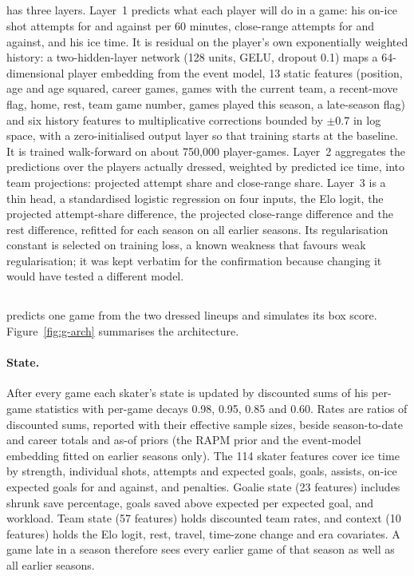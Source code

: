\subsection{\neurhlH{}}
\label{sec:m-h}

\neurhlH{} has three layers. Layer~1 predicts what each player will do in a game:
his on-ice shot attempts for and against per 60 minutes, close-range attempts
for and against, and his ice time. It is residual on the player's own
exponentially weighted history: a two-hidden-layer network (128 units, GELU,
dropout 0.1) maps a 64-dimensional player embedding from the event model, 13
static features (position, age and age squared, career games, games with the
current team, a recent-move flag, home, rest, team game number, games played
this season, a late-season flag) and six history features to multiplicative
corrections bounded by $\pm 0.7$ in log space, with a zero-initialised output
layer so that training starts at the baseline. It is trained walk-forward on
about 750,000 player-games. Layer~2 aggregates the predictions over the
players actually dressed, weighted by predicted ice time, into team
projections: projected attempt share and close-range share. Layer~3 is a thin
head, a standardised logistic regression on four inputs, the Elo logit, the
projected attempt-share difference, the projected close-range difference and
the rest difference, refitted for each season on all earlier seasons. Its
regularisation constant is selected on training loss, a known weakness that
favours weak regularisation; it was kept verbatim for the confirmation because
changing it would have tested a different model.

\subsection{\neurhlG{}}
\label{sec:m-g}

\neurhlG{} predicts one game from the two dressed lineups and simulates its box
score. Figure~\ref{fig:g-arch} summarises the architecture.

\paragraph{State.}
After every game each skater's state is updated by discounted sums of his
per-game statistics with per-game decays 0.98, 0.95, 0.85 and 0.60. Rates are
ratios of discounted sums, reported with their effective sample sizes, beside
season-to-date and career totals and as-of priors (the RAPM prior and the
event-model embedding fitted on earlier seasons only). The 114 skater features
cover ice time by strength, individual shots, attempts and expected goals,
goals, assists, on-ice expected goals for and against, and penalties. Goalie
state (23 features) includes shrunk save percentage, goals saved above
expected per expected goal, and workload. Team state (57 features) holds
discounted team rates, and context (10 features) holds the Elo logit, rest,
travel, time-zone change and era covariates. A game late in a season therefore
sees every earlier game of that season as well as all earlier seasons.

